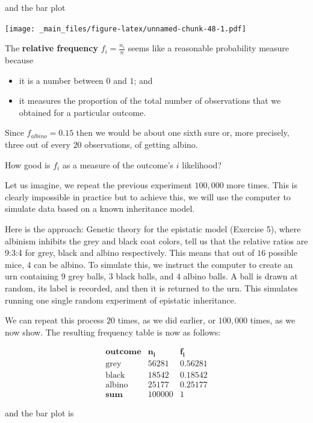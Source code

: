 \documentclass[
]{book}
\providecommand{\tightlist}{%
  \setlength{\itemsep}{0pt}\setlength{\parskip}{0pt}}
\begin{document}
and the bar plot

\texttt{[image: \_main\_files/figure-latex/unnamed-chunk-48-1.pdf]}

The \textbf{relative frequency} \(f_i =\frac{n_ i}{n}\) seems like a reasonable probability measure because

\begin{itemize}
\tightlist
\item
  it is a number between \(0\) and \(1\); and
\item
  it measures the proportion of the total number of observations that we obtained for a particular outcome.
\end{itemize}

Since \(f_{albino}=0.15\) then we would be about one sixth sure or, more precisely, three out of every \(20\) observations, of getting albino.

How good is \(f_i\) as a measure of the outcome's \(i\) likelihood?

Let us imagine, we repeat the previous experiment \(100,000\) more times. This is clearly impossible in practice but to achieve this, we will use the computer to simulate data based on a known inheritance model.

Here is the approach: Genetic theory for the epistatic model (Exercise 5), where albinism inhibits the grey and black coat colors, tell us that the relative ratios are 9:3:4 for grey, black and albino respectively. This means that out of \(16\) possible mice, \(4\) can be albino. To simulate this, we instruct the computer to create an urn containing \(9\) grey balls, \(3\) black balls, and \(4\) albino balls. A ball is drawn at random, its label is recorded, and then it is returned to the urn. This simulates running one single random experiment of epistatic inheritance.

We can repeat this process \(20\) times, as we did earlier, or \(100,000\) times, as we now show. The resulting frequency table is now as follows:

\[
\begin{array}{ccc}
\mathbf{outcome}   & \mathbf{n_i} & \mathbf{f_i} \\
\text{grey}  & 56281    & 0.56281  \\
\text{black}   & 18542    & 0.18542  \\ 
\text{albino}  & 25177    & 0.25177  \\
\hline
\mathbf{sum} & 100000 & 1
\end{array}
\]

and the bar plot is
\end{document}
